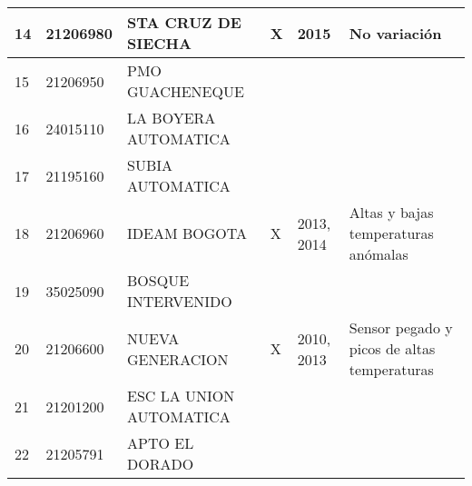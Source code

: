 \begin{table}[H]
\begin{tabular}{lllp{2cm}lp{3cm}}
14 & 21206980 & STA CRUZ DE SIECHA      & X                 & 2015        & No variación                                \\ \hline
15 & 21206950 & PMO GUACHENEQUE         &                   &             &                                             \\ \hline
16 & 24015110 & LA BOYERA AUTOMATICA    &                   &             &                                             \\ \hline
17 & 21195160 & SUBIA AUTOMATICA        &                   &             &                                             \\ \hline
18 & 21206960 & IDEAM BOGOTA            & X                 & 2013, 2014  & Altas y bajas temperaturas anómalas         \\ \hline
19 & 35025090 & BOSQUE INTERVENIDO      &                   &             &                                             \\ \hline
20 & 21206600 & NUEVA GENERACION        & X                 & 2010, 2013  & Sensor pegado y picos de altas temperaturas \\ \hline
21 & 21201200 & ESC LA UNION AUTOMATICA &                   &             &                                             \\ \hline
22 & 21205791 & APTO EL DORADO          &                   &             &                                            
\end{tabular}
\end{table}

